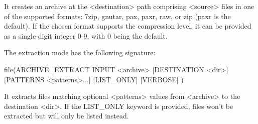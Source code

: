 It creates an archive at the <destination> path comprising <source> files in one of the supported formats: 7zip, gnutar, pax, paxr, raw, or zip (paxr is the default). If the chosen format supports the compression level, it can be provided as a single-digit integer 0-9, with 0 being the default.

The extraction mode has the following signature:

\begin{shell}
file(ARCHIVE_EXTRACT INPUT <archive> [DESTINATION <dir>]
    [PATTERNS <patterns>...] [LIST_ONLY] [VERBOSE]
)
\end{shell}

It extracts files matching optional <patterns> values from <archive> to the destination <dir>. If the LIST\_ONLY keyword is provided, files won’t be extracted but will only be listed instead.



